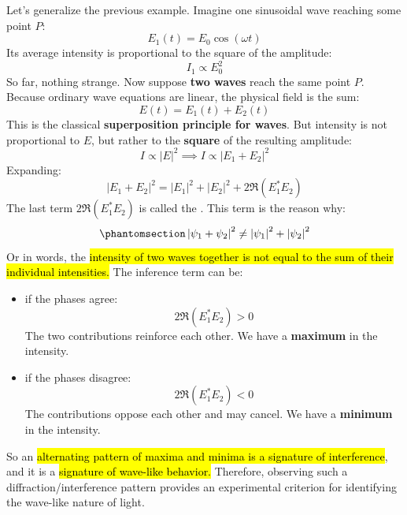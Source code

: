 \highspace
Let's generalize the previous example. Imagine one sinusoidal wave reaching some point $P$:
\begin{equation*}
    E_1(t) = E_0 \cos(\omega t)
\end{equation*}
Its average intensity is proportional to the square of the amplitude:
\begin{equation*}
    I_1 \propto E_0^2
\end{equation*}
So far, nothing strange. Now suppose \textbf{two waves} reach the same point $P$. Because ordinary wave equations are linear, the physical field is the sum:
\begin{equation*}
    E(t) = E_1(t) + E_2(t)
\end{equation*}
This is the classical \textbf{superposition principle for waves}. But intensity is not proportional to $E$, but rather to the \textbf{square} of the resulting amplitude:
\begin{equation*}
    I \propto \left|E\right|^{2} \implies I \propto \left|E_1 + E_2\right|^{2}
\end{equation*}
Expanding:
\begin{equation*}
    \left|E_1 + E_2\right|^{2} = \left|E_1\right|^{2} + \left|E_2\right|^{2} + 2\Re\left(E_1^* E_2\right)
\end{equation*}
The last term $2\Re\left(E_1^* E_2\right)$ is called the . This term is the reason why:
\begin{equation*}\phantomsection\label{def:interference-term}
    \left|\psi_1 + \psi_2\right|^{2} \neq \left|\psi_1\right|^{2} + \left|\psi_2\right|^{2}
\end{equation*}
Or in words, the \hl{intensity of two waves together is not equal to the sum of their individual intensities.} The inference term can be:
\begin{itemize}
    \item {} if the phases agree:
        \begin{equation*}
            2\Re\left(E_1^* E_2\right) > 0
        \end{equation*}
        The two contributions reinforce each other. We have a \textbf{maximum} in the intensity.

    \item {} if the phases disagree:
        \begin{equation*}
            2\Re\left(E_1^* E_2\right) < 0
        \end{equation*}
        The contributions oppose each other and may cancel. We have a \textbf{minimum} in the intensity.
\end{itemize}
So an \hl{alternating pattern of maxima and minima is a signature of interference}, and it is a \hl{signature of wave-like behavior.} Therefore, observing such a diffraction/interference pattern provides an experimental criterion for identifying the wave-like nature of light.


